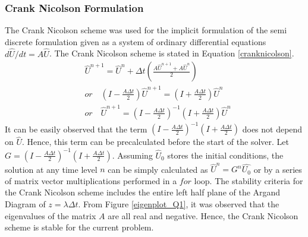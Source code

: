 \documentclass[12pt]{article}
\begin{document}
\subsubsection{Crank Nicolson Formulation}
The Crank Nicolson scheme was used for the implicit formulation of the semi discrete formulation given as a system of ordinary differential equations $d \hat{U}/dt = A \hat{U}$. The Crank Nicolson scheme is stated in Equation \ref{cranknicolson}.
\begin{equation}
    \begin{aligned}
        & \hat{U}^{n + 1} = \hat{U}^n + \Delta t \left( \frac{A \hat{U}^{n + 1} + A \hat{U}^{n} }{2} \right) \\
        & or \quad \left( I - \frac{A \Delta t}{2} \right) \hat{U}^{n + 1} = \left( I + \frac{A \Delta t}{2} \right) \hat{U}^n \\
        & or \quad \hat{U}^{n + 1} = \left( I - \frac{A \Delta t}{2} \right)^{-1} \left( I + \frac{A \Delta t}{2} \right) \hat{U}^n
    \end{aligned}
    \label{cranknicolson}
\end{equation}
It can be easily observed that the term $\left( I - \frac{A \Delta t}{2} \right)^{-1} \left( I + \frac{A \Delta t}{2} \right)$ does not depend on $\hat{U}$. Hence, this term can be precalculated before the start of the solver. Let $G = \left( I - \frac{A \Delta t}{2} \right)^{-1} \left( I + \frac{A \Delta t}{2} \right)$. Assuming $\hat{U}_0$ stores the initial conditions, the solution at any time level $n$ can be simply calculated as $\hat{U}^n = G^n \hat{U_0}$ or by a series of matrix vector multiplications performed in a $for$ loop.
The stability criteria for the Crank Nicolson scheme includes the entire left half plane of the Argand Diagram of $z = \lambda \Delta t$. From Figure \ref{eigenplot_Q1}, it was observed that the eigenvalues of the matrix $A$ are all real and negative. Hence, the Crank Nicolson scheme is stable for the current problem.
\end{document}
